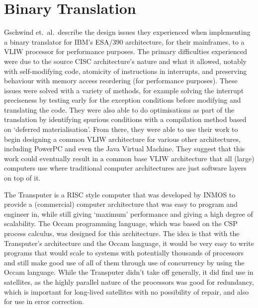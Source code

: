 \section{Binary Translation}

Gschwind et.\ al.\ describe the design issues they experienced when implementing
a binary translator for IBM's ESA/390 architecture, for their mainframes, to a
VLIW processor for performance purposes. The primary difficulties experienced
were due to the source CISC architecture's nature and what it allowed, notably
with self-modifying code, atomicity of instructions in interrupts, and
preserving behaviour with memory access reordering (for performance purposes).
These issues were solved with a variety of methods, for example solving the
interrupt preciseness by testing early for the exception conditions before
modifying and translating the code. They were also able to do optimisations as
part of the translation by identifying spurious conditions with a compilation
method based on `deferred materialisation'. From there, they were able to use
their work to begin designing a common VLIW architecture for various other
architectures, including PowerPC and even the Java Virtual Machine. They suggest
that this work could eventually result in a common base VLIW architecture that
all (large) computers use where traditional computer architectures are just
software layers on top of it.\cite{Gschwind2000BinaryTranslation}

The Transputer is a RISC style computer that was developed by INMOS to provide a
(commercial) computer architecture that was easy to program and engineer in,
while still giving `maximum' performance and giving a high degree of
scalability. The Occam programming language, which was based on the CSP process
calculus, was designed for this architecture.  The idea is that with the
Transputer's architecture and the Occam language, it would be very easy to write
programs that would scale to systems with potentially thousands of processors
and still make good use of all of them through use of concurrency by using the
Occam language.\cite{Whitby1985Transputer} While the Transputer didn't take off
generally, it did find use in satellites, as the highly parallel nature of the
processors was good for redundancy, which is important for long-lived satellites
with no possibility of repair, and also for use in error
correction.\cite{Mattos1990Transputer}

